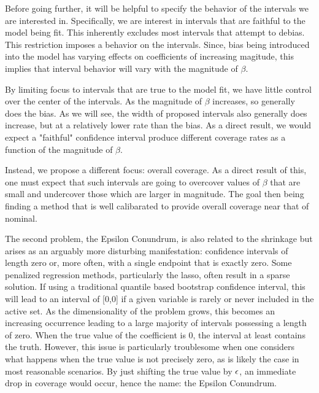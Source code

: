 Before going further, it will be helpful to specify the behavior of the intervals we are interested in. Specifically, we are interest in intervals that are faithful to the model being fit. This inherently excludes most intervals that attempt to debias. This restriction imposes a behavior on the intervals. Since, bias being introduced into the model has varying effects on coefficients of increasing magitude, this implies that interval behavior will vary with the magnitude of $\beta$.

By limiting focus to intervals that are true to the model fit, we have little control over the center of the intervals. As the magnitude of $\beta$ increases, so generally does the bias. As we will see, the width of proposed intervals also generally does increase, but at a relatively lower rate than the bias. As a direct result, we would expect a "faithful" confidence interval produce different coverage rates as a function of the magnitude of $\beta$.

Instead, we propose a different focus: overall coverage. As a direct result of this, one must expect that such intervals are going to overcover values of $\beta$ that are small and undercover those which are larger in magnitude. The goal then being finding a method that is well calibarated to provide overall coverage near that of nominal.

The second problem, the Epsilon Conundrum, is also related to the shrinkage but arises as an arguably more disturbing manifestation: confidence intervals of length zero or, more often, with a single endpoint that is exactly zero. Some penalized regression methods, particularly the lasso, often result in a sparse solution. If using a traditional quantile based bootstrap confidence interval, this will lead to an interval of [0,0] if a given variable is rarely or never included in the active set. As the dimensionality of the problem grows, this becomes an increasing occurrence leading to a large majority of intervals possessing a length of zero. When the true value of the coefficient is 0, the interval at least contains the truth. However, this issue is particularly troublesome when one considers what happens when the true value is not precisely zero, as is likely the case in most reasonable scenarios. By just shifting the true value by $\epsilon$, an immediate drop in coverage would occur, hence the name: the Epsilon Conundrum.

\begin{figure}[htbp]
  \centering
\end{figure}


